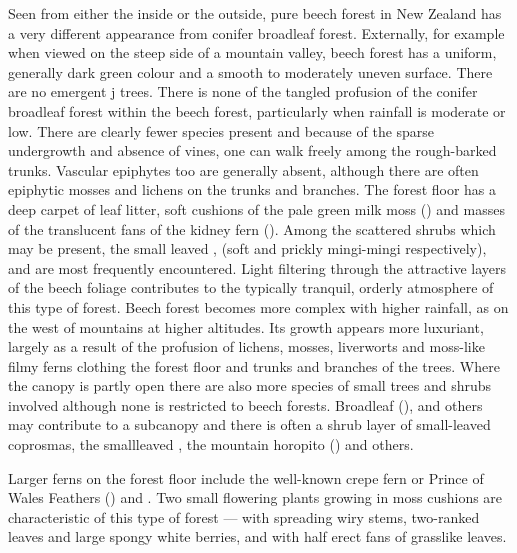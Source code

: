 Seen from either the inside or the outside, pure beech forest in New Zealand has a very different appearance from conifer broadleaf forest.
Externally, for example when viewed on the steep side of a mountain valley, beech forest has a uniform, generally dark green colour and a smooth to moderately uneven surface.
There are no emergent j trees.
There is none of the tangled profusion of the conifer broadleaf forest within the beech forest, particularly when rainfall is moderate or low.
There are clearly fewer species present and because of the sparse undergrowth and absence of vines, one can walk freely among the rough-barked trunks.
Vascular epiphytes too are generally absent, although there are often epiphytic mosses and lichens on the trunks and branches.
The forest floor has a deep carpet of leaf litter, soft cushions of the pale green milk moss () and masses of the translucent fans of the kidney fern ().
Among the scattered shrubs which may be present, the small leaved ,  (soft and prickly mingi-mingi respectively),  and  are most frequently encountered.
Light filtering through the attractive layers of the beech foliage contributes to the typically tranquil, orderly atmosphere of this type of forest.
Beech forest becomes more complex with higher rainfall, as on the west of mountains at higher altitudes.
Its growth appears more luxuriant, largely as a result of the profusion of lichens, mosses, liverworts and moss-like filmy ferns clothing the forest floor and trunks and branches of the trees.
Where the canopy is partly open there are also more species of small trees and shrubs involved although none is restricted to beech forests.
Broadleaf (),   and others may contribute to a subcanopy and there is often a shrub layer of small-leaved coprosmas, the smallleaved , the mountain horopito () and others.

Larger ferns on the forest floor include the well-known crepe fern or Prince of Wales Feathers () and .
Two small flowering plants growing in moss cushions are characteristic of this type of forest —  with spreading wiry stems, two-ranked leaves and large spongy white berries, and  with half erect fans of grasslike leaves.

